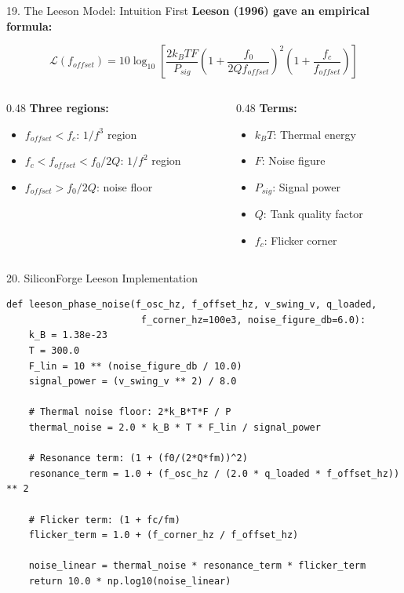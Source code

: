 \documentclass[aspectratio=169, 11pt]{beamer}
\begin{document}
\begin{frame}{19. The Leeson Model: Intuition First}
    \textbf{Leeson (1996) gave an empirical formula:}

    \vspace{0.5em}
    \[ \mathcal{L}(f_{offset}) = 10\log_{10}\left[\frac{2k_B T F}{P_{sig}} \left(1 + \frac{f_0}{2Q f_{offset}}\right)^2 \left(1 + \frac{f_c}{f_{offset}}\right)\right] \]

    \vspace{0.5em}
    \begin{columns}[T]
        \begin{column}{0.48\textwidth}
            \textbf{Three regions:}
            \begin{itemize}
                \item $f_{offset} < f_c$: $1/f^3$ region
                \item $f_c < f_{offset} < f_0/2Q$: $1/f^2$ region
                \item $f_{offset} > f_0/2Q$: noise floor
            \end{itemize}
        \end{column}
        \begin{column}{0.48\textwidth}
            \textbf{Terms:}
            \begin{itemize}
                \item $k_B T$: Thermal energy
                \item $F$: Noise figure
                \item $P_{sig}$: Signal power
                \item $Q$: Tank quality factor
                \item $f_c$: Flicker corner
            \end{itemize}
        \end{column}
    \end{columns}
\end{frame}

\begin{frame}{20. SiliconForge Leeson Implementation}
    \begin{lstlisting}
def leeson_phase_noise(f_osc_hz, f_offset_hz, v_swing_v, q_loaded,
                        f_corner_hz=100e3, noise_figure_db=6.0):
    k_B = 1.38e-23
    T = 300.0
    F_lin = 10 ** (noise_figure_db / 10.0)
    signal_power = (v_swing_v ** 2) / 8.0

    # Thermal noise floor: 2*k_B*T*F / P
    thermal_noise = 2.0 * k_B * T * F_lin / signal_power

    # Resonance term: (1 + (f0/(2*Q*fm))^2)
    resonance_term = 1.0 + (f_osc_hz / (2.0 * q_loaded * f_offset_hz)) ** 2

    # Flicker term: (1 + fc/fm)
    flicker_term = 1.0 + (f_corner_hz / f_offset_hz)

    noise_linear = thermal_noise * resonance_term * flicker_term
    return 10.0 * np.log10(noise_linear)
    \end{lstlisting}
\end{frame}
\end{document}
